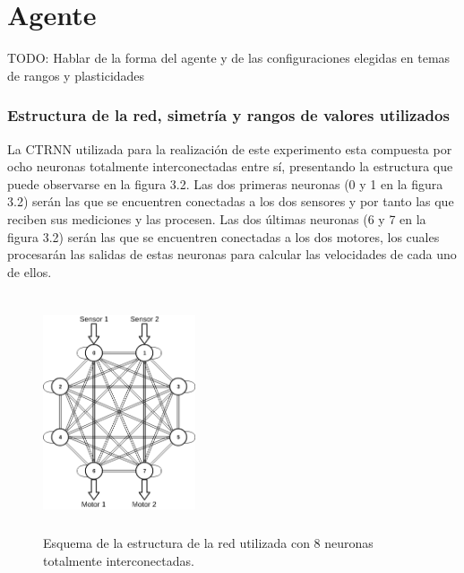 \section{Agente}
TODO: Hablar de la forma del agente y de las configuraciones elegidas en temas de rangos y plasticidades

\subsubsection{Estructura de la red, simetría y rangos de valores utilizados}
La CTRNN utilizada para la realización de este experimento esta compuesta por ocho neuronas totalmente interconectadas entre sí, presentando la estructura que puede observarse en la figura 3.2.
Las dos primeras neuronas (0 y 1 en la figura 3.2) serán las que se encuentren conectadas a los dos sensores y por tanto las que reciben sus mediciones y las procesen. Las dos últimas neuronas
(6 y 7 en la figura 3.2) serán las que se encuentren conectadas a los dos motores, los cuales procesarán las salidas de estas neuronas para calcular las velocidades de cada uno de ellos.

\begin{figure}[!h]
	\centering
	\includegraphics[width=0.4\textwidth,height=7cm]{Imagenes/MyRed}
	\caption{Esquema de la estructura de la red utilizada con 8 neuronas totalmente interconectadas.}
	\label{fig:figuraMyRed}
\end{figure}

